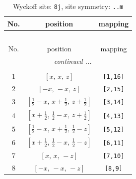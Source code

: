 \documentclass[fleqn,8pt]{jsarticle}
\begin{document}
\begin{longtable}{ccc}
\caption{Wyckoff site: {\tt 8j}, site symmetry: {\tt ..m}}
 \\
 \hline \hline
No. & position & mapping \\ \hline \endfirsthead

\multicolumn{2}{l}{\tablename\ \thetable{}} \\
 \hline \hline
No. & position & mapping \\ \hline \endhead

 \hline \hline
\multicolumn{2}{r}{\footnotesize\it continued ...} \\ \endfoot

 \hline \hline
\multicolumn{2}{r}{} \\ \endlastfoot

1 & $\left[ x,\, x,\, z \right]$ & {\tt [1,16]} \\ \hline
2 & $\left[ - x,\, - x,\, z \right]$ & {\tt [2,15]} \\ \hline
3 & $\left[ \frac{1}{2} - x,\, x + \frac{1}{2},\, z + \frac{1}{2} \right]$ & {\tt [3,14]} \\ \hline
4 & $\left[ x + \frac{1}{2},\, \frac{1}{2} - x,\, z + \frac{1}{2} \right]$ & {\tt [4,13]} \\ \hline
5 & $\left[ \frac{1}{2} - x,\, x + \frac{1}{2},\, \frac{1}{2} - z \right]$ & {\tt [5,12]} \\ \hline
6 & $\left[ x + \frac{1}{2},\, \frac{1}{2} - x,\, \frac{1}{2} - z \right]$ & {\tt [6,11]} \\ \hline
7 & $\left[ x,\, x,\, - z \right]$ & {\tt [7,10]} \\ \hline
8 & $\left[ - x,\, - x,\, - z \right]$ & {\tt [8,9]} \\
\end{longtable}
\renewcommand{\arraystretch}{1.2}
\end{document}
